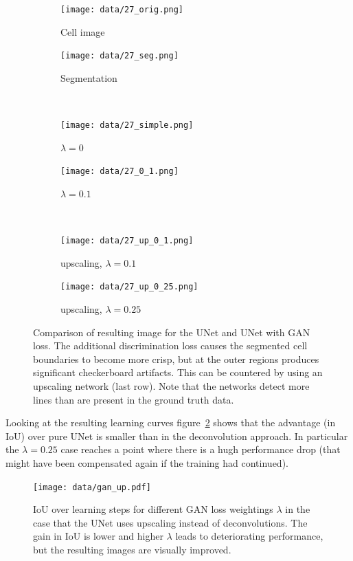 \documentclass[aps,prl,twocolumn,groupedaddress,amsmath,amssymb]{revtex4-1}
\begin{document}
    \begin{figure}[tbp]
        \begin{subfigure}[c]{0.45\linewidth}
            \texttt{[image: data/27\_orig.png]}
            \caption{Cell image}
        \end{subfigure} %
        \begin{subfigure}[c]{0.45\linewidth}
            \texttt{[image: data/27\_seg.png]}
            \caption{Segmentation}
        \end{subfigure} \\
        \begin{subfigure}[c]{0.45\linewidth}
            \texttt{[image: data/27\_simple.png]}
            \caption{$\lambda=0$}
        \end{subfigure}%
        \begin{subfigure}[c]{0.45\linewidth}
            \texttt{[image: data/27\_0\_1.png]}
            \caption{$\lambda=0.1$}
        \end{subfigure}\\
        \begin{subfigure}[c]{0.45\linewidth}
            \texttt{[image: data/27\_up\_0\_1.png]}
            \caption{upscaling, $\lambda=0.1$}
        \end{subfigure}%
        \begin{subfigure}[c]{0.45\linewidth}
            \texttt{[image: data/27\_up\_0\_25.png]}
            \caption{upscaling, $\lambda=0.25$}
        \end{subfigure}
        \caption{Comparison of resulting image for the UNet and UNet with GAN loss.
         The additional discrimination loss causes the segmented cell boundaries
        to become more crisp, but at the outer regions produces significant checkerboard artifacts.
        This can be countered by using an upscaling network (last row).
        Note that the networks detect more lines than are present in the ground truth data.}
        \label{fig:unet_vs_ganunet}
    \end{figure}

    Looking at the resulting learning curves figure~\ref{fig:gan_up} shows that the advantage 
    (in IoU) over pure UNet is smaller than in the deconvolution approach. In particular the 
    $\lambda=0.25$ case reaches a point where there is a hugh performance drop (that might have been
    compensated again if the training had continued).

    \begin{figure}[tbp]
        \begin{center}
        \texttt{[image: data/gan\_up.pdf]}
        \end{center}
        \caption{IoU over learning steps for different GAN loss weightings $\lambda$ in the
        case that the UNet uses upscaling instead of deconvolutions. The gain in IoU is lower
        and higher $\lambda$ leads to deteriorating performance, but the resulting images are
        visually improved.}
        \label{fig:gan_up}
    \end{figure}
\end{document}
